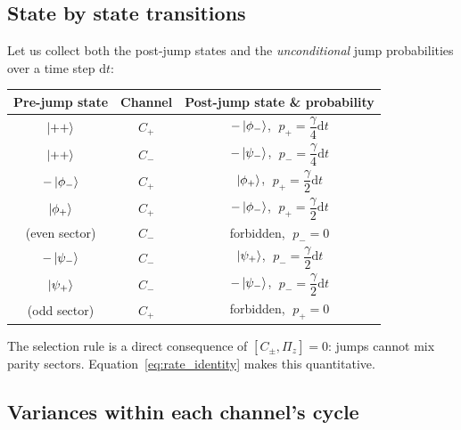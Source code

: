 \documentclass[12pt,a4paper]{article}
\begin{document}
	\subsection{State by state transitions}
	Let us collect both the post-jump states and the \emph{unconditional} jump probabilities over a time step \(\mathrm{d}t\):
	\begin{center}
		\renewcommand{\arraystretch}{1.3}
		\begin{tabular}{c|c|c}
			Pre-jump state & Channel & Post-jump state \& probability \\ \hline
			\(\ket{++}\) & \(C_+\) & \(-\ket{\phi_-}\), \(\;p_+=\dfrac{\gamma}{4}\mathrm{d}t\) \\
			\(\ket{++}\) & \(C_-\) & \(-\ket{\psi_-}\), \(\;p_-=\dfrac{\gamma}{4}\mathrm{d}t\) \\ \hline
			\(-\ket{\phi_-}\) & \(C_+\) & \(\ket{\phi_+}\), \(\;p_+=\dfrac{\gamma}{2}\mathrm{d}t\) \\
			\(\ket{\phi_+}\) & \(C_+\) & \(-\ket{\phi_-}\), \(\;p_+=\dfrac{\gamma}{2}\mathrm{d}t\) \\
			(even sector) & \(C_-\) & forbidden, \(\;p_-=0\) \\ \hline
			\(-\ket{\psi_-}\) & \(C_-\) & \(\ket{\psi_+}\), \(\;p_-=\dfrac{\gamma}{2}\mathrm{d}t\) \\
			\(\ket{\psi_+}\) & \(C_-\) & \(-\ket{\psi_-}\), \(\;p_-=\dfrac{\gamma}{2}\mathrm{d}t\) \\
			(odd sector) & \(C_+\) & forbidden, \(\;p_+=0\)
		\end{tabular}
	\end{center}
	The selection rule is a direct consequence of \([C_\pm,\Pi_z]=0\): jumps cannot mix parity sectors. Equation~\eqref{eq:rate_identity} makes this quantitative.
	
	\subsection{Variances within each channel's cycle}
	
\end{document}
